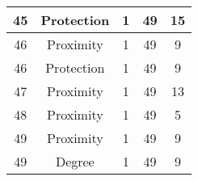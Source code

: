 \documentclass[results.tex]{subfiles}
\begin{document}
\begin{center}
\begin{tabular}{| c || c | c | c | c |}
            \hline
            45                      & Protection                   & 1                      & 49                      & 15                   \\
            \hline
            46                      & Proximity                    & 1                      & 49                      & 9                    \\
            \hline
            46                      & Protection                   & 1                      & 49                      & 9                    \\
            \hline
            47                      & Proximity                    & 1                      & 49                      & 13                   \\
            \hline
            48                      & Proximity                    & 1                      & 49                      & 5                    \\
            \hline
            49                      & Proximity                    & 1                      & 49                      & 9                    \\
            \hline
            49                      & Degree                       & 1                      & 49                      & 9                    \\
            \hline
        \end{tabular}
    \end{center}
\end{document}
